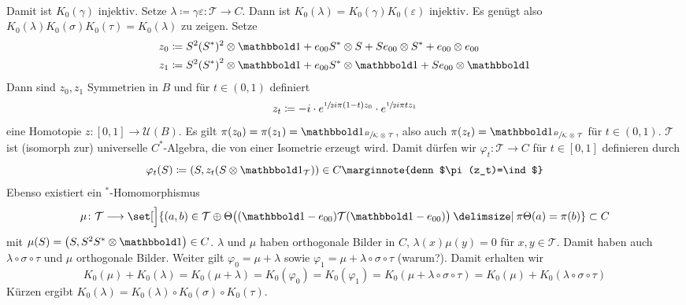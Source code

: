 \begin{beweis}
\[\begin{tikzcd}
		\end{tikzcd}
	\]
	Damit ist $K_0(\gamma)$ injektiv.
	Setze $\lambda \coloneqq \gamma \varepsilon \colon \mathcal{T} \to C$.
	Dann ist $K_0(\lambda) = K_0(\gamma) K_0(\varepsilon)$ injektiv.
	Es genügt also $K_0(\lambda) K_0(\sigma) K_0(\tau) = K_0(\lambda)$ zu zeigen.
	Setze 
	\begin{align}
		z_0 &\coloneqq S^2 \enbrace{S^*}^2 \otimes \ind + e_{00}S^* \otimes S + Se_{00} \otimes S^* + e_{00} \otimes e_{00} \\
		z_1 &\coloneqq S^2 \enbrace*{S^*}^2 \otimes \ind + e_{00} S^* \otimes \ind + S e_{00} \otimes \ind
	\end{align}
	Dann sind $z_0,z_1$ Symmetrien in $B$ und für $t \in (0,1)$ definiert
	\[
		z_t \coloneqq -i \cdot e^{\sfrac{1}{2} i \pi (1-t) z_0} \cdot e^{ \sfrac{1}{2} i \pi t z_1}
	\]
	eine Homotopie $z \colon [0,1] \to \mathcal{U}(B)$.
	Es gilt $\pi(z_0) = \pi(z_1) = \ind_{\sfrac{B}{\mathcal{K} \otimes \mathcal{T}}}$, also auch $\pi(z_t) = \ind_{\sfrac{B}{\mathcal{K} \otimes \mathcal{T}}}$ für $t \in (0,1)$.
	$\mathcal{T}$ ist (isomorph zur) universelle $C^*$-Algebra, die von einer Isometrie erzeugt wird.
	Damit dürfen wir $\varphi_t \colon \mathcal{T} \to C$ für $t \in [0,1]$ definieren durch 
	\[
		\varphi_t(S) \coloneqq \enbrace*{S,z_t \enbrace*{S \otimes \ind_\mathcal{T}}} \in C \marginnote{denn $\pi(z_t)=\ind$}
	\]
	Ebenso existiert ein $^*$-Homomorphismus 
	\[
		\mu \colon \mathcal{T} \longrightarrow \set[\Big]{(a,b) \in \mathcal{T} \oplus \Theta \enbrace[\big]{(\ind -e_{00}) \mathcal{T}(\ind - e_{00})} \given \pi \Theta(a)= \pi(b)}  \subset C 
	\]
	mit $\mu(S) = \enbrace*{S, S^2 S^* \otimes \ind} \in C$. 
	$\lambda$ und $\mu$ haben orthogonale Bilder in $C$, $\lambda(x) \mu(y)=0$ für $x,y \in \mathcal{T}$.
	Damit haben auch $\lambda \circ \sigma \circ \tau$ und $\mu$ orthogonale Bilder.
	Weiter gilt $\varphi_0 = \mu + \lambda$ sowie $\varphi_1 = \mu + \lambda \circ \sigma \circ \tau$ (warum?).
	Damit erhalten wir
	\[
		K_0(\mu) + K_0(\lambda) = K_0(\mu + \lambda) = K_0(\varphi_0) = K_0(\varphi_1) = K_0(\mu + \lambda \circ \sigma \circ \tau) = K_0(\mu) + K_0(\lambda \circ \sigma \circ \tau)
	\]
	Kürzen ergibt $K_0(\lambda) = K_0(\lambda) \circ K_0(\sigma) \circ K_0(\tau)$.
\end{beweis}

